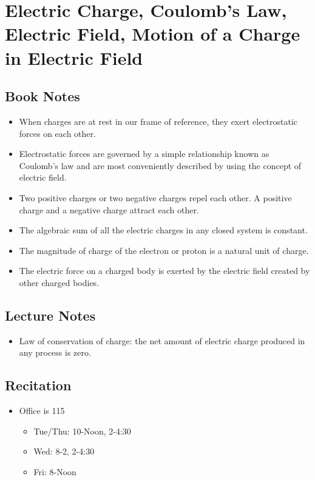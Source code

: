 \documentclass[11pt]{article}
\newcommand{\chapterTitle}{Electric Charge, Coulomb’s Law, Electric Field, Motion of a Charge in Electric Field}
\begin{document}
\section{\chapterTitle}

\subsection{Book Notes}
\begin{itemize}
    \item When charges are at rest in our frame of reference, they exert electrostatic forces on each other.
    \item Electrostatic forces are governed by a simple relationship known as Coulomb’s law and are most conveniently described by using the concept of electric field.
    \item Two positive charges or two negative charges repel each other. A positive charge and a negative charge attract each other.
    \item The algebraic sum of all the electric charges in any closed system is constant.
    \item The magnitude of charge of the electron or proton is a natural unit of charge.
    \item The electric force on a charged body is exerted by the electric field created by other charged bodies.
\end{itemize}

\subsection{Lecture Notes}
\begin{itemize}
    \item Law of conservation of charge: the net amount of electric charge produced in any process is zero.
\end{itemize}

\subsection{Recitation}
\begin{itemize}
    \item Office is 115
    \begin{itemize}
        \item Tue/Thu: 10-Noon, 2-4:30
        \item Wed: 8-2, 2-4:30
        \item Fri: 8-Noon
    \end{itemize}
\end{itemize}
\end{document}
